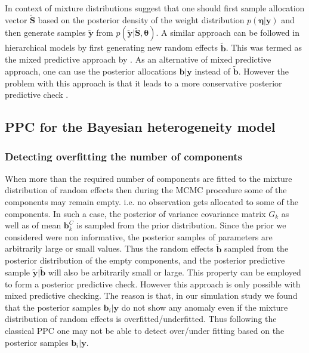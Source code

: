 In context of mixture distributions \citet{fruhwirth-schnatter_finite_2013} suggest that one should first sample allocation vector $\boldsymbol{\tilde{S}}$ based on the posterior density of the weight distribution $p(\boldsymbol{\eta}|\boldsymbol{y})$ and then generate samples $\boldsymbol{\tilde{y}}$ from $p(\boldsymbol{\tilde{y}}|\boldsymbol{\tilde{S}}, \boldsymbol{\theta})$. A similar approach can be followed in hierarchical models by first generating new random effects $\boldsymbol{\tilde{b}}$. This was termed as the mixed predictive approach by \citet{marshall_approximate_2003}. As an alternative of mixed predictive approach, one can use the posterior allocations $\boldsymbol{b}|\boldsymbol{y}$ instead of $\boldsymbol{\tilde{b}}$. However the problem with this approach is that it leads to a more conservative posterior predictive check \citep{congdon_applied_2010}.\\

\subsection{PPC for the Bayesian heterogeneity model}
\label{subsec : ppc_bhtge}
\subsubsection{Detecting overfitting the number of components}
When more than the required number of components are fitted to the mixture distribution of random effects then  during the MCMC procedure some of the components may remain empty. i.e. no observation gets allocated to some of the components. In such a case, the posterior of variance covariance matrix $G_k$ as well as of mean $\boldsymbol{b}_k^C$ is sampled from the prior distribution. Since the prior we considered were non informative, the posterior samples of parameters are arbitrarily large or small values. Thus the random effects $\boldsymbol{\tilde{b}}$ sampled from the posterior distribution of the empty components, and the posterior predictive sample $\boldsymbol{\tilde{y}} | \boldsymbol{\tilde{b}}$ will also be arbitrarily small or large. This property can be employed to form a posterior predictive check. However this approach is only possible with mixed predictive checking. The reason is that, in our simulation study we found that the posterior samples $\boldsymbol{b}_i|\boldsymbol{y}$ do not show any anomaly even if the mixture distribution of random effects is overfitted/underfitted. Thus following the classical PPC one may not be able to detect over/under fitting based on the posterior samples $\boldsymbol{b}_i|\boldsymbol{y}$.\\

